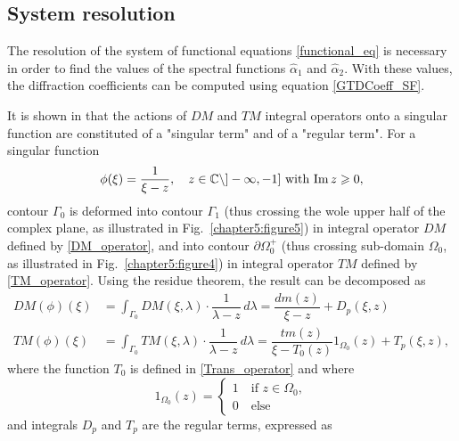 \subsection{System resolution}
\label{Chapter5:System_resolution}

The resolution of the system of functional equations \eqref{functional_eq} is necessary in order to find the values of the spectral functions $\hat{\alpha}_1 $ and $\hat{\alpha}_2 $. With these values, the diffraction coefficients can be computed using equation \eqref{GTDCoeff_SF}. 

It is shown in \cite{CroisilleLebeau} that the actions of $DM$ and $TM$ integral operators onto a singular function are constituted of a "singular term" and of a "regular term". For a singular function 
\begin{equation}
\label{Chapter5:arbitrary_function}
\phi(\xi) = \dfrac{1}{\xi - z},  \quad z \in \mathbb{C}\setminus ]-\infty,-1] \text{ with } {\rm Im} \, z \geqslant 0,
\end{equation}
contour $\Gamma_0$ is deformed into contour $\Gamma_1$ (thus crossing the wole upper half of the complex plane, as illustrated in Fig.~\ref{chapter5:figure5}) in integral operator $DM$ defined by \eqref{DM_operator}, and into contour $\partial \Omega_0^+$ (thus crossing sub-domain $\Omega_0$, as illustrated in Fig.~\ref{chapter5:figure4}) in integral operator $TM$ defined by \eqref{TM_operator}. Using the residue theorem, the result can be decomposed as
\begin{subequations}
\label{Int_op_decomp}
\begin{align}
\label{Int_op_decomp_DM}
DM(\phi)(\xi) &= \int_{\Gamma_0} DM(\xi,\lambda) \cdot \dfrac{1}{\lambda - z} \, d \lambda = \dfrac{dm(z)}{\xi - z}  + D_p(\xi,z) \\
\label{Int_op_decomp_TM}
TM(\phi)(\xi) &= \int_{\Gamma_0} TM(\xi,\lambda) \cdot \dfrac{1}{\lambda - z} \, d \lambda = \dfrac{tm(z) }{\xi - T_0(z)} 1_{\Omega_0}(z) + T_p(\xi,z),
\end{align}
\end{subequations}
where the function $T_0$ is defined in \eqref{Trans_operator} and where
\begin{equation}
1_{\Omega_0}(z) = 
\begin{cases}
1 \quad \text{if } z  \in \Omega_0, \\
0 \quad \text{else}
\end{cases}
\end{equation}
and integrals $D_p$ and $T_p$ are the regular terms, expressed as
